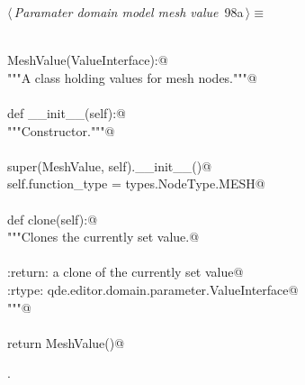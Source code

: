 \documentclass[
    a4paper,      %
    10pt,         %
    openright,    %
    notitlepage,  %
    parskip=half, %
]{scrreprt}       %
\theoremstyle{definition}                    %
\begin{document}
\begin{flushleft} \small
\begin{minipage}{\linewidth}\label{scrap157}\raggedright\small
{} $\langle\,${\itshape Paramater domain model mesh value}\nobreak\ {\footnotesize {98a}}$\,\rangle\equiv$
\vspace{-1exm}
\begin{list}{}{} \item
\mbox{}\lstinline@@\\
\mbox{}\lstinline@class MeshValue(ValueInterface):@\\
\mbox{}\lstinline@    """A class holding values for mesh nodes."""@\\
\mbox{}\lstinline@@\\
\mbox{}\lstinline@    def __init__(self):@\\
\mbox{}\lstinline@        """Constructor."""@\\
\mbox{}\lstinline@@\\
\mbox{}\lstinline@        super(MeshValue, self).__init__()@\\
\mbox{}\lstinline@        self.function_type = types.NodeType.MESH@\\
\mbox{}\lstinline@@\\
\mbox{}\lstinline@    def clone(self):@\\
\mbox{}\lstinline@        """Clones the currently set value.@\\
\mbox{}\lstinline@@\\
\mbox{}\lstinline@        :return: a clone of the currently set value@\\
\mbox{}\lstinline@        :rtype:  qde.editor.domain.parameter.ValueInterface@\\
\mbox{}\lstinline@        """@\\
\mbox{}\lstinline@@\\
\mbox{}\lstinline@        return MeshValue()@{\NWsep}
\end{list}
\vspace{-1.5ex}
\footnotesize
\begin{list}{}{\setlength{\itemsep}{-\parsep}\setlength{\itemindent}{-\leftmargin}}
\item {\NWtxtMacroNoRef}.

\item{}
\end{list}
\end{minipage}\vspace{4ex}
\end{flushleft}
\end{document}
